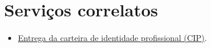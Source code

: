 \section{Serviços correlatos}

\begin{itemize}
	\item
	\hyperref[chap:pf-cip]{Entrega da carteira de identidade profissional (CIP)}.
\end{itemize}

\sumario